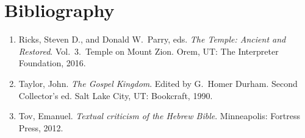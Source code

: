 \section{Bibliography}
\begin{enumerate}
  \item Ricks, Steven D., and Donald W.\ Parry, eds. \textit{The Temple: Ancient and Restored}. Vol.\ 3.\ Temple on Mount Zion. Orem, UT: The Interpreter Foundation, 2016.
  \item Taylor, John. \textit{The Gospel Kingdom}. Edited by G.\ Homer Durham. Second Collector's ed. Salt Lake City, UT: Bookcraft, 1990.
  \item Tov, Emanuel. \textit{Textual criticism of the Hebrew Bible}. Minneapolis: Fortress Press, 2012.
\end{enumerate}
